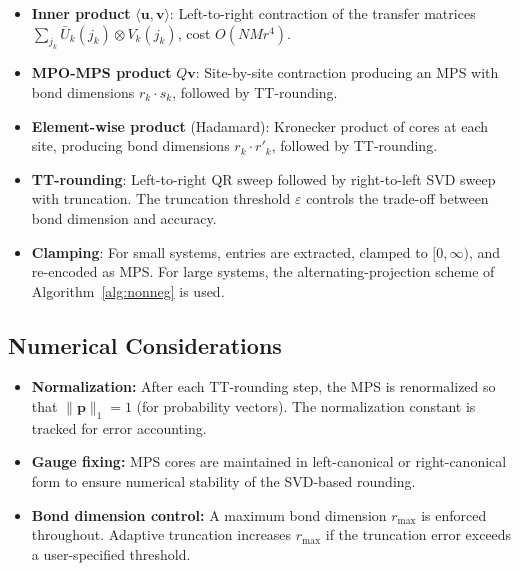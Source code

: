 \documentclass[11pt]{article}
\newcommand{\norm}[1]{\lVert #1 \rVert}
\newcommand{\eps}{\varepsilon}
\begin{document}
\begin{itemize}[itemsep=2pt]
\item \textbf{Inner product} $\langle\mathbf{u},\mathbf{v}\rangle$:
  Left-to-right contraction of the transfer matrices
  $\sum_{j_k} \bar{U}_k(j_k) \otimes V_k(j_k)$, cost $O(NMr^4)$.

\item \textbf{MPO-MPS product} $Q\mathbf{v}$:
  Site-by-site contraction producing an MPS with bond dimensions
  $r_k \cdot s_k$, followed by TT-rounding.

\item \textbf{Element-wise product} (Hadamard):
  Kronecker product of cores at each site, producing bond dimensions
  $r_k \cdot r'_k$, followed by TT-rounding.

\item \textbf{TT-rounding}:
  Left-to-right QR sweep followed by right-to-left SVD sweep with
  truncation.
  The truncation threshold $\eps$ controls the trade-off between
  bond dimension and accuracy.

\item \textbf{Clamping}:
  For small systems, entries are extracted, clamped to $[0,\infty)$,
  and re-encoded as MPS.
  For large systems, the alternating-projection scheme of
  Algorithm~\ref{alg:nonneg} is used.
\end{itemize}

\subsection{Numerical Considerations}

\begin{itemize}[itemsep=2pt]
\item \textbf{Normalization:}
  After each TT-rounding step, the MPS is renormalized so that
  $\norm{\mathbf{p}}_1 = 1$ (for probability vectors).
  The normalization constant is tracked for error accounting.

\item \textbf{Gauge fixing:}
  MPS cores are maintained in left-canonical or right-canonical
  form to ensure numerical stability of the SVD-based rounding.

\item \textbf{Bond dimension control:}
  A maximum bond dimension $r_{\max}$ is enforced throughout.
  Adaptive truncation increases $r_{\max}$ if the truncation error
  exceeds a user-specified threshold.
\end{itemize}
\end{document}
